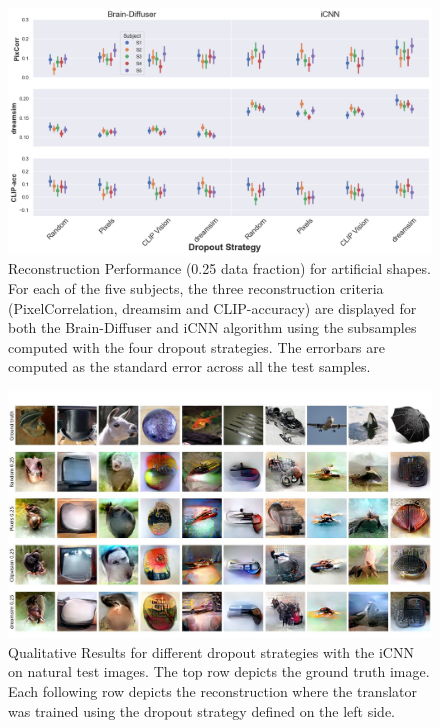\begin{figure}[ht]
  \centering
  \includegraphics[width=1\textwidth]{plots/dropout_eval_reconstruction_art.png}
  \caption[Experiment 1: Reconstruction performance for artificial shapes]{Reconstruction Performance (0.25 data fraction) for artificial shapes. For each of the five subjects, the three reconstruction criteria (PixelCorrelation, dreamsim and CLIP-accuracy) are displayed for both the Brain-Diffuser and iCNN algorithm using the subsamples computed with the four dropout strategies. The errorbars are computed as the standard error across all the test samples.}\label{fig:dropout_eval_reconstruction_art}
\end{figure}


\begin{figure}[ht]
  \centering
  \includegraphics[width=1\textwidth]{plots/dropout_qual_eval_icnn_test.JPEG}
  \caption[Experiment 1: Reconstructed images for iCNN on natural test images]{Qualitative Results for different dropout strategies with the iCNN on natural test images. The top row depicts the ground truth image. Each following row depicts the reconstruction where the translator was trained using the dropout strategy defined on the left side.}\label{fig:dropout_qual_eval_icnn_test}
\end{figure}

